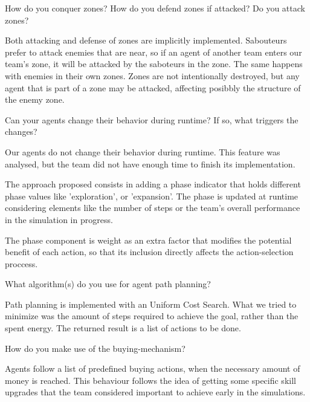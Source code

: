 \begin{question}
How do you conquer zones? How do you defend zones if attacked? Do you attack
zones?  
\end{question}

Both attacking and defense of zones are implicitly implemented.  Sabouteurs
prefer to attack enemies that are near, so if an agent of another team enters
our team's zone, it will be attacked by the saboteurs in the zone.  The same
happens with enemies in their own zones. Zones are not intentionally destroyed,
but any agent that is part of a zone may be attacked, affecting posibbly the
structure of the enemy zone.

\begin{question}
Can your agents change their behavior during runtime? If so, what triggers
the changes?  
\end{question}
Our agents do not change their behavior during runtime. This feature was 
    analysed, but the team did not have enough time to finish its implementation.
    
    The approach proposed consists in adding a phase indicator that holds different 
    phase values like 'exploration', or 'expansion'. The phase is updated at runtime
    considering elements like the number of steps or the team's overall performance 
    in the simulation in progress.
    
    The phase component is weight as an extra factor that modifies the potential 
    benefit of each action, so that its inclusion directly affects the action-selection 
    proccess.
    
\begin{question}
What algorithm(s) do you use for agent path planning?  
\end{question}

Path planning is implemented with an Uniform Cost Search. What we tried to
minimize was the amount of steps required to achieve the goal, rather than the
spent energy. The returned result is a list of actions to be done.

\begin{question}
How do you make use of the buying-mechanism?  
\end{question}

Agents follow a list of predefined buying actions, when the necessary amount of
money is reached. This behaviour follows the idea of getting some specific skill
upgrades that the team considered important to achieve early in the simulations.

